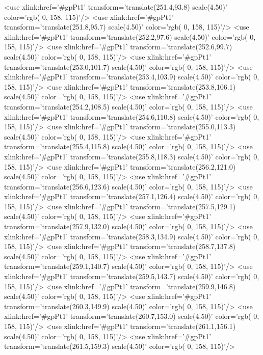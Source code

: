 	<use xlink:href='#gpPt1' transform='translate(251.4,93.8) scale(4.50)' color='rgb(  0, 158, 115)'/>
	<use xlink:href='#gpPt1' transform='translate(251.8,95.7) scale(4.50)' color='rgb(  0, 158, 115)'/>
	<use xlink:href='#gpPt1' transform='translate(252.2,97.6) scale(4.50)' color='rgb(  0, 158, 115)'/>
	<use xlink:href='#gpPt1' transform='translate(252.6,99.7) scale(4.50)' color='rgb(  0, 158, 115)'/>
	<use xlink:href='#gpPt1' transform='translate(253.0,101.7) scale(4.50)' color='rgb(  0, 158, 115)'/>
	<use xlink:href='#gpPt1' transform='translate(253.4,103.9) scale(4.50)' color='rgb(  0, 158, 115)'/>
	<use xlink:href='#gpPt1' transform='translate(253.8,106.1) scale(4.50)' color='rgb(  0, 158, 115)'/>
	<use xlink:href='#gpPt1' transform='translate(254.2,108.5) scale(4.50)' color='rgb(  0, 158, 115)'/>
	<use xlink:href='#gpPt1' transform='translate(254.6,110.8) scale(4.50)' color='rgb(  0, 158, 115)'/>
	<use xlink:href='#gpPt1' transform='translate(255.0,113.3) scale(4.50)' color='rgb(  0, 158, 115)'/>
	<use xlink:href='#gpPt1' transform='translate(255.4,115.8) scale(4.50)' color='rgb(  0, 158, 115)'/>
	<use xlink:href='#gpPt1' transform='translate(255.8,118.3) scale(4.50)' color='rgb(  0, 158, 115)'/>
	<use xlink:href='#gpPt1' transform='translate(256.2,121.0) scale(4.50)' color='rgb(  0, 158, 115)'/>
	<use xlink:href='#gpPt1' transform='translate(256.6,123.6) scale(4.50)' color='rgb(  0, 158, 115)'/>
	<use xlink:href='#gpPt1' transform='translate(257.1,126.4) scale(4.50)' color='rgb(  0, 158, 115)'/>
	<use xlink:href='#gpPt1' transform='translate(257.5,129.1) scale(4.50)' color='rgb(  0, 158, 115)'/>
	<use xlink:href='#gpPt1' transform='translate(257.9,132.0) scale(4.50)' color='rgb(  0, 158, 115)'/>
	<use xlink:href='#gpPt1' transform='translate(258.3,134.9) scale(4.50)' color='rgb(  0, 158, 115)'/>
	<use xlink:href='#gpPt1' transform='translate(258.7,137.8) scale(4.50)' color='rgb(  0, 158, 115)'/>
	<use xlink:href='#gpPt1' transform='translate(259.1,140.7) scale(4.50)' color='rgb(  0, 158, 115)'/>
	<use xlink:href='#gpPt1' transform='translate(259.5,143.7) scale(4.50)' color='rgb(  0, 158, 115)'/>
	<use xlink:href='#gpPt1' transform='translate(259.9,146.8) scale(4.50)' color='rgb(  0, 158, 115)'/>
	<use xlink:href='#gpPt1' transform='translate(260.3,149.9) scale(4.50)' color='rgb(  0, 158, 115)'/>
	<use xlink:href='#gpPt1' transform='translate(260.7,153.0) scale(4.50)' color='rgb(  0, 158, 115)'/>
	<use xlink:href='#gpPt1' transform='translate(261.1,156.1) scale(4.50)' color='rgb(  0, 158, 115)'/>
	<use xlink:href='#gpPt1' transform='translate(261.5,159.3) scale(4.50)' color='rgb(  0, 158, 115)'/>

